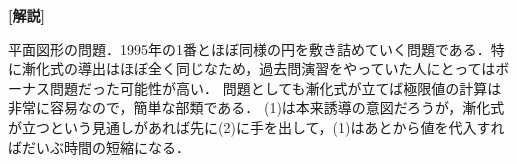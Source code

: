 \documentclass[a4paper,10pt]{ltjsarticle}
\begin{document}
\begin{multicols}{2}
\vspace{10pt}
{\bf[解説]}

平面図形の問題．1995年の1番とほぼ同様の円を敷き詰めていく問題である．特に漸化式の導出はほぼ全く同じなため，過去問演習をやっていた人にとってはボーナス問題だった可能性が高い．
問題としても漸化式が立てば極限値の計算は非常に容易なので，簡単な部類である．
(1)は本来誘導の意図だろうが，漸化式が立つという見通しがあれば先に(2)に手を出して，(1)はあとから値を代入すればだいぶ時間の短縮になる．

\newpage
\end{multicols}
\end{document}
